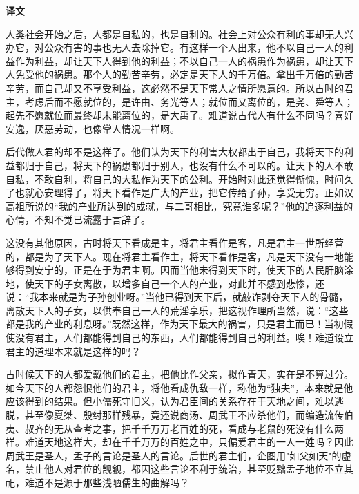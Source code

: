 \documentclass[12pt,UTF-8,openany,a4]{ctexbook}
\begin{document}
\newpage

\begin{Large}
    \noindent\textbf{译文}
\end{Large}


\vspace{1em}

\begin{large}
    \yiwen 
    人类社会开始之后，人都是自私的，也是自利的。社会上对公众有利的事却无人兴办它，对公众有害的事也无人去除掉它。有这样一个人出来，他不以自己一人的利益作为利益，却让天下人得到他的利益；不以自己一人的祸患作为祸患，却让天下人免受他的祸患。那个人的勤苦辛劳，必定是天下人的千万倍。拿出千万倍的勤苦辛劳，而自己却又不享受利益，这必然不是天下常人之情所愿意的。所以古时的君主，考虑后而不愿就位的，是许由、务光等人；就位而又离位的，是尧、舜等人；起先不愿就位而最终却未能离位的，是大禹了。难道说古代人有什么不同吗？喜好安逸，厌恶劳动，也像常人情况一样啊。
    
    后代做人君的却不是这样了。他们认为天下的利害大权都出于自己，我将天下的利益都归于自己，将天下的祸患都归于别人，也没有什么不可以的。让天下的人不敢自私，不敢自利，将自己的大私作为天下的公利。开始时对此还觉得惭愧，时间久了也就心安理得了，将天下看作是广大的产业，把它传给子孙，享受无穷。正如汉高祖所说的“我的产业所达到的成就，与二哥相比，究竟谁多呢？”他的追逐利益的心情，不知不觉已流露于言辞了。
    
    这没有其他原因，古时将天下看成是主，将君主看作是客，凡是君主一世所经营的，都是为了天下人。现在将君主看作主，将天下看作是客，凡是天下没有一地能够得到安宁的，正是在于为君主啊。因而当他未得到天下时，使天下的人民肝脑涂地，使天下的子女离散，以增多自己一个人的产业，对此并不感到悲惨，还说：“我本来就是为子孙创业呀。”当他已得到天下后，就敲诈剥夺天下人的骨髓，离散天下人的子女，以供奉自己一人的荒淫享乐，把这视作理所当然，说：“这些都是我的产业的利息呀。”既然这样，作为天下最大的祸害，只是君主而已！当初假使没有君主，人们都能得到自己的东西，人们都能得到自己的利益。唉！难道设立君主的道理本来就是这样的吗？
    
    古时候天下的人都爱戴他们的君主，把他比作父亲，拟作青天，实在是不算过分。如今天下的人都怨恨他们的君主，将他看成仇敌一样，称他为“独夫”，本来就是他应该得到的结果。但小儒死守旧义，认为君臣间的关系存在于天地之间，难以逃脱，甚至像夏桀、殷纣那样残暴，竟还说商汤、周武王不应杀他们，而编造流传伯夷、叔齐的无从查考之事，把千千万万老百姓的死，看成与老鼠的死没有什么两样。难道天地这样大，却在千千万万的百姓之中，只偏爱君主的一人一姓吗？因此周武王是圣人，孟子的言论是圣人的言论。后世的君主们，企图用"如父如天"的虚名，禁止他人对君位的觊觎，都因这些言论不利于统治，甚至贬黜孟子地位不立其祀，难道不是源于那些浅陋儒生的曲解吗？
    

\end{large}
\end{document}
